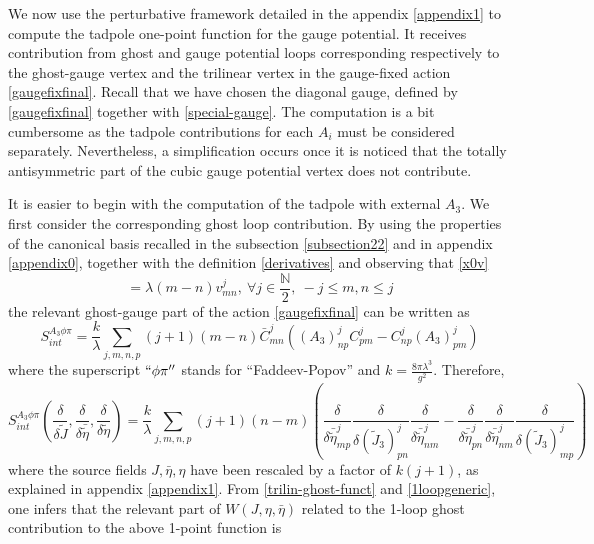 \documentclass[a4paper,11pt]{article}
\numberwithin{equation}{section}
\theoremstyle{nonumberplain}
\begin{document}
We now use the perturbative framework detailed  in the appendix \ref{appendix1} to compute the tadpole one-point function for the gauge potential. It receives contribution from ghost and gauge potential loops corresponding respectively to the ghost-gauge vertex and the trilinear vertex in the gauge-fixed action \eqref{gaugefixfinal}. Recall that we have chosen the diagonal gauge, defined by \eqref{gaugefixfinal} together with \eqref{special-gauge}. The computation is a bit cumbersome as the tadpole contributions for each $A_i$ must be considered separately. Nevertheless, a simplification occurs once it is noticed that the totally antisymmetric part of the cubic gauge potential vertex does not contribute.\par 
It is easier to begin with the computation of the tadpole with external $A_3$. We first consider the corresponding ghost loop contribution. By using the properties of the canonical basis recalled in the subsection \ref{subsection22} and in appendix \ref{appendix0}, together with the definition \eqref{derivatives} and observing that  \eqref{x0v}
\begin{equation}
[x_3,v^j_{mn}]=\lambda(m-n)v^j_{mn},\ \forall j\in\frac{\mathbb{N}}{2},\ -j\le m,n\le j
\end{equation}
the relevant ghost-gauge part of the action \eqref{gaugefixfinal} can be written as
\begin{equation}
S_{int}^{A_3\phi\pi}=\frac{k}{\lambda}\sum_{j,m,n,p}(j+1) (m-n)\bar C^j_{mn}((A_3)^j_{np}C^j_{pm}-C^j_{np}(A_3)^j_{pm})\label{sintghost}
\end{equation}
where the superscript $``\phi\pi''$ stands for ``Faddeev-Popov'' and $k=\frac{8\pi\lambda^3}{g^2}$.
Therefore,
\begin{equation}
S_{int}^{A_3\phi\pi}(\frac{\delta}{\delta \widetilde J},\frac{\delta}{\delta \bar{\widetilde \eta}},\frac{\delta}{\delta\widetilde\eta})=\frac{k}{\lambda}\sum_{j,m,n,p}(j+1) (n-m)(\frac{\delta}{\delta\bar{\widetilde \eta}^j_{mp}}\frac{\delta}{\delta (\widetilde J_3)^j_{pn}}\frac{\delta}{\delta\bar {\widetilde \eta}^j_{nm}}-\frac{\delta}{\delta\bar{\widetilde \eta}^j_{pn}}\frac{\delta}{\delta\bar {\widetilde\eta}^j_{nm}}\frac{\delta}{\delta (\widetilde J_3)^j_{mp}})\label{trilin-ghost-funct}
\end{equation}
where the source fields $J, \bar \eta, \eta$ have been rescaled by a factor of $k (j+1)$, as explained in appendix \ref{appendix1}.
From \eqref{trilin-ghost-funct} and \eqref{1loopgeneric}, one infers that the relevant part of $W(J,\eta,\bar\eta)$ related to the 1-loop ghost contribution to the above  1-point function is
\end{document}
